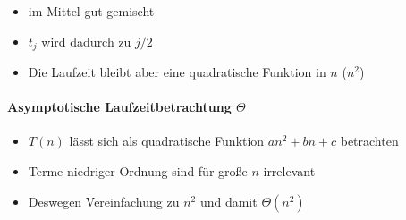 \documentclass[
    ngerman,
    color=3b,
    dark_mode,
    summary,
    boxarc,
]{rubos-tuda-template}
\begin{document}
\begin{description}[itemsep=1em]
    \item [\texttt{Average Case}]
          \begin{itemize}
              \item im Mittel gut gemischt
              \item $t_j$ wird dadurch zu $j/2$
              \item Die Laufzeit bleibt aber eine quadratische Funktion in $n$ ($n^2$)
          \end{itemize}
\end{description}

\paragraph{Asymptotische Laufzeitbetrachtung $\Theta$} {\label{insSortLaufzeitTheta}}
\begin{itemize}
    \item $T(n)$ lässt sich als quadratische Funktion $an^2 + bn + c$ betrachten
    \item Terme niedriger Ordnung sind für gro\ss e $n$ irrelevant
    \item Deswegen Vereinfachung zu $n^2$ und damit $\Theta(n^2)$
\end{itemize}
\clearpage
\end{document}
